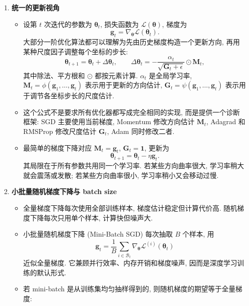 \documentclass{../nndlcourse}
\begin{document}
\begin{enumerate}
  \item \textbf{统一的更新视角}
    \begin{itemize}
      \item 设第 $t$ 次迭代的参数为 $\boldsymbol{\theta}_t$, 损失函数为 $\mathcal{L}(\boldsymbol{\theta})$, 梯度为
      \[
        \boldsymbol{g}_t = \nabla_{\boldsymbol{\theta}} \mathcal{L}(\boldsymbol{\theta}_t).
      \]
      大部分一阶优化算法都可以理解为先由历史梯度构造一个更新方向, 再用某种尺度因子调整每个坐标的步长:
      \[
        \boldsymbol{\theta}_{t+1}
        =
        \boldsymbol{\theta}_t+\Delta\boldsymbol{\theta}_t,
        \qquad
        \Delta\boldsymbol{\theta}_t
        =
        -\frac{\alpha_t}{\sqrt{\boldsymbol{G}_t+\epsilon}}
        \odot
        \boldsymbol{M}_t,
      \]
      其中除法、平方根和 $\odot$ 都按元素计算. $\alpha_t$ 是全局学习率, $\boldsymbol{M}_t=\phi(\boldsymbol{g}_1,\dots,\boldsymbol{g}_t)$ 表示用于更新的方向估计, $\boldsymbol{G}_t=\psi(\boldsymbol{g}_1,\dots,\boldsymbol{g}_t)$ 表示用于调节各坐标步长的尺度估计.
      \item 这个公式不是要求所有优化器都写成完全相同的实现, 而是提供一个诊断框架: SGD 主要使用当前梯度, Momentum 修改方向估计 $\boldsymbol{M}_t$, Adagrad 和 RMSProp 修改尺度估计 $\boldsymbol{G}_t$, Adam 同时修改二者.
      \item 最简单的梯度下降对应 $\boldsymbol{M}_t=\boldsymbol{g}_t$, $\boldsymbol{G}_t=\boldsymbol{1}$, 更新为
      \[
        \boldsymbol{\theta}_{t+1}
        =
        \boldsymbol{\theta}_t-\eta\boldsymbol{g}_t.
      \]
      其局限在于所有参数共用同一个学习率. 若某些方向曲率很大, 学习率稍大就会震荡或发散; 若某些方向曲率很小, 学习率稍小又会移动过慢.
    \end{itemize}
  \item \textbf{小批量随机梯度下降与 batch size}
    \begin{itemize}
      \item 全量梯度下降每次使用全部训练样本, 梯度估计稳定但计算代价高. 随机梯度下降每次只用单个样本, 计算快但噪声大.
      \item 小批量随机梯度下降 (Mini-Batch SGD) 每次抽取 $B$ 个样本, 用
      \[
        \boldsymbol{g}_t =
        \frac{1}{B}\sum_{i \in \mathcal{B}_t}
        \nabla_{\boldsymbol{\theta}}\mathcal{L}^{(i)}(\boldsymbol{\theta}_t)
      \]
      近似全量梯度. 它兼顾并行效率、内存开销和梯度噪声, 因而是深度学习训练的默认形式.
      \item 若 mini-batch 是从训练集均匀抽样得到的, 则随机梯度的期望等于全量梯度:

\end{itemize}
\end{enumerate}
\end{document}
